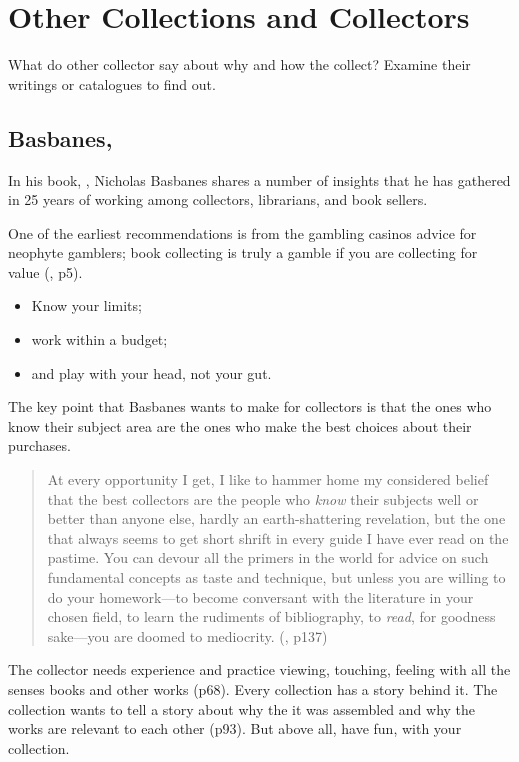 \documentclass[letterpaper]{article}
\begin{document}
\section{Other Collections and Collectors}

What do other collector say about why and how the collect? Examine
their writings or catalogues to find out.

\subsection{Basbanes, }

In his book, , Nicholas Basbanes shares a number
of insights that he has gathered in 25 years of working among collectors,
librarians, and book sellers.

One of the earliest recommendations is from the gambling casinos
advice for neophyte gamblers; book collecting is truly a gamble
if you are collecting for value (\cite{Basbanes2002}, p5).

\begin{itemize}
\item Know your limits;
\item work within a budget;
\item and play with your head, not your gut.
\end{itemize}

The key point that Basbanes wants to make for collectors is that
the ones who know their subject area are the ones who make
the best choices about their purchases.

\begin{quotation}
  At every opportunity I get, I like to hammer home my considered
  belief that the best collectors are the people who {\itshape know}
  their subjects well or better than anyone else, hardly an
  earth-shattering revelation, but the one that always seems to get
  short shrift in every guide I have ever read on the pastime.
  You can devour all the primers in the world for advice on
  such fundamental concepts as taste and technique, but unless
  you are willing to do your homework---to become conversant
  with the literature in your chosen field, to learn the rudiments
  of bibliography, to {\itshape read}, for goodness sake---you are
  doomed to mediocrity. (\cite{Basbanes2002}, p137)
\end{quotation}

The collector needs experience and practice viewing, touching, feeling
with all the senses books and other works (p68). Every collection has a
story behind it. The collection wants to tell a story about why the
it was assembled and why the works are relevant to each other (p93).
But above all, have fun, with your collection.
\end{document}
